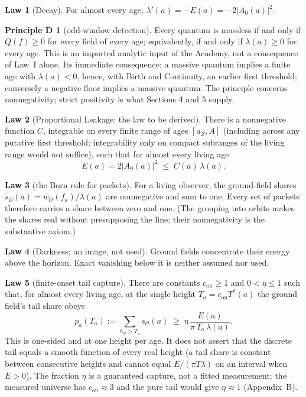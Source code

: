 \documentclass[11pt]{article}
\theoremstyle{definition}
\newtheorem{law}{Law}
\newtheorem*{principle}{Principle D}
\theoremstyle{remark}
\newcommand{\Tst}{T^{*}}
\newcommand{\con}{c_{\mathrm{on}}}
\begin{document}
\begin{law}[Decay]\label{law:decay}
For almost every age, $\lambda'(a)=-E(a)=-2|A_0(a)|^2$.
\end{law}

\begin{principle}[odd-window detection]
Every quantum is massless if and only if $Q(f)\ge0$ for every field of every age; equivalently, if and only if $\lambda(a)\ge0$ for every age. This is an imported analytic input of the Academy, not a consequence of Law~I alone. Its immediate consequence: a massive quantum implies a finite age with $\lambda(a)<0$, hence, with Birth and Continuity, an earlier first threshold; conversely a negative floor implies a massive quantum. The principle concerns nonnegativity; strict positivity is what Sections 4 and 5 supply.
\end{principle}

\begin{law}[Proportional Leakage; the law to be derived]\label{law:leak}
There is a nonnegative function $C$, integrable on every finite range of ages $[a_Z,A]$ (including across any putative first threshold; integrability only on compact subranges of the living range would not suffice), such that for almost every living age
\[
E(a)=2|A_0(a)|^2\;\le\;C(a)\,\lambda(a).
\]
\end{law}

\begin{law}[the Born rule for packets]\label{law:born}
For a living observer, the ground-field shares $s_{\mathcal O}(a)=w_{\mathcal O}(f_a)/\lambda(a)$ are nonnegative and sum to one. Every set of packets therefore carries a share between zero and one. (The grouping into orbits makes the shares real without presupposing the line; their nonnegativity is the substantive axiom.)
\end{law}

\begin{law}[Darkness; an image, not used]\label{law:dark}
Ground fields concentrate their energy above the horizon. Exact vanishing below it is neither assumed nor used.
\end{law}

\begin{law}[finite-onset tail capture]\label{law:capture}
There are constants $\con\ge1$ and $0<\eta\le1$ such that, for almost every living age, at the single height $T_a=\con\Tst(a)$ the ground field's tail share obeys
\[
p_a(T_a):=\sum_{h_{\mathcal O}>T_a}s_{\mathcal O}(a)\;\ge\;\eta\,\frac{E(a)}{\pi\,T_a\,\lambda(a)} .
\]
This is one-sided and at one height per age. It does not assert that the discrete tail equals a smooth function of every real height (a tail share is constant between consecutive heights and cannot equal $E/(\pi T\lambda)$ on an interval when $E>0$). The fraction $\eta$ is a guaranteed capture, not a fitted measurement; the measured universe has $\con\approx3$ and the pure tail would give $\eta\approx1$ (Appendix~B).
\end{law}
\end{document}
